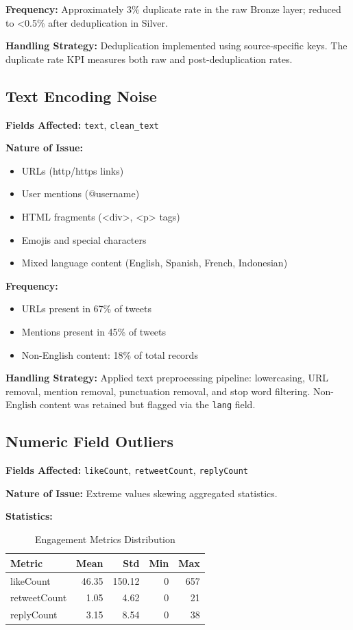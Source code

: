 \documentclass[12pt]{article}
\begin{document}
\textbf{Frequency:} Approximately 3\% duplicate rate in the raw Bronze layer; reduced to <0.5\% after deduplication in Silver.

\textbf{Handling Strategy:} Deduplication implemented using source-specific keys. The duplicate rate KPI measures both raw and post-deduplication rates.

\subsection{Text Encoding Noise}

\textbf{Fields Affected:} \texttt{text}, \texttt{clean\_text}

\textbf{Nature of Issue:} 
\begin{itemize}
    \item URLs (http/https links)
    \item User mentions (@username)
    \item HTML fragments (<div>, <p> tags)
    \item Emojis and special characters
    \item Mixed language content (English, Spanish, French, Indonesian)
\end{itemize}

\textbf{Frequency:} 
\begin{itemize}
    \item URLs present in 67\% of tweets
    \item Mentions present in 45\% of tweets
    \item Non-English content: 18\% of total records
\end{itemize}

\textbf{Handling Strategy:} Applied text preprocessing pipeline: lowercasing, URL removal, mention removal, punctuation removal, and stop word filtering. Non-English content was retained but flagged via the \texttt{lang} field.

\subsection{Numeric Field Outliers}

\textbf{Fields Affected:} \texttt{likeCount}, \texttt{retweetCount}, \texttt{replyCount}

\textbf{Nature of Issue:} Extreme values skewing aggregated statistics.

\textbf{Statistics:}
\begin{table}[H]
\centering
\caption{Engagement Metrics Distribution}
\label{tab:engagement_stats}
\begin{tabular}{lrrrr}
\toprule
\textbf{Metric} & \textbf{Mean} & \textbf{Std} & \textbf{Min} & \textbf{Max} \\
\midrule
likeCount & 46.35 & 150.12 & 0 & 657 \\
retweetCount & 1.05 & 4.62 & 0 & 21 \\
replyCount & 3.15 & 8.54 & 0 & 38 \\
\bottomrule
\end{tabular}
\end{table}
\end{document}
